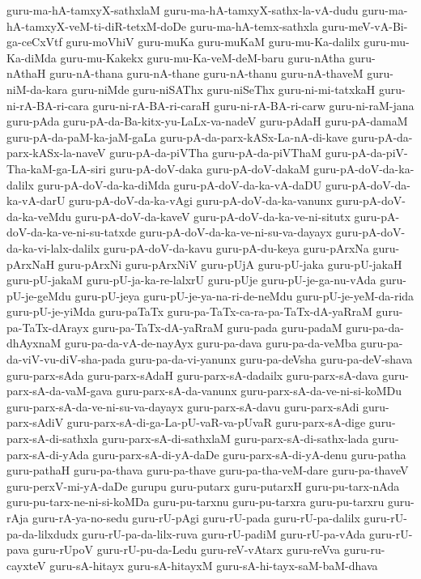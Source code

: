 {guru-ma-hA-tamxyX-sathxlaM
guru-ma-hA-tamxyX-sathx-la-vA-dudu
guru-ma-hA-tamxyX-veM-ti-diR-tetxM-doDe
guru-ma-hA-temx-sathxla
guru-meV-vA-Bi-ga-ceCxVtf
guru-moVhiV
guru-muKa
guru-muKaM
guru-mu-Ka-dalilx
guru-mu-Ka-diMda
guru-mu-Kakekx
guru-mu-Ka-veM-deM-baru
guru-nAtha
guru-nAthaH
guru-nA-thana
guru-nA-thane
guru-nA-thanu
guru-nA-thaveM
guru-niM-da-kara
guru-niMde
guru-niSAThx
guru-niSeThx
guru-ni-mi-tatxkaH
guru-ni-rA-BA-ri-cara
guru-ni-rA-BA-ri-caraH
guru-ni-rA-BA-ri-carw
guru-ni-raM-jana
guru-pAda
guru-pA-da-Ba-kitx-yu-LaLx-va-nadeV
guru-pAdaH
guru-pA-damaM
guru-pA-da-paM-ka-jaM-gaLa
guru-pA-da-parx-kASx-La-nA-di-kave
guru-pA-da-parx-kASx-la-naveV
guru-pA-da-piVTha
guru-pA-da-piVThaM
guru-pA-da-piV-Tha-kaM-ga-LA-siri
guru-pA-doV-daka
guru-pA-doV-dakaM
guru-pA-doV-da-ka-dalilx
guru-pA-doV-da-ka-diMda
guru-pA-doV-da-ka-vA-daDU
guru-pA-doV-da-ka-vA-darU
guru-pA-doV-da-ka-vAgi
guru-pA-doV-da-ka-vanunx
guru-pA-doV-da-ka-veMdu
guru-pA-doV-da-kaveV
guru-pA-doV-da-ka-ve-ni-situtx
guru-pA-doV-da-ka-ve-ni-su-tatxde
guru-pA-doV-da-ka-ve-ni-su-va-dayayx
guru-pA-doV-da-ka-vi-lalx-dalilx
guru-pA-doV-da-kavu
guru-pA-du-keya
guru-pArxNa
guru-pArxNaH
guru-pArxNi
guru-pArxNiV
guru-pUjA
guru-pU-jaka
guru-pU-jakaH
guru-pU-jakaM
guru-pU-ja-ka-re-lalxrU
guru-pUje
guru-pU-je-ga-nu-vAda
guru-pU-je-geMdu
guru-pU-jeya
guru-pU-je-ya-na-ri-de-neMdu
guru-pU-je-yeM-da-rida
guru-pU-je-yiMda
guru-paTaTx
guru-pa-TaTx-ca-ra-pa-TaTx-dA-yaRraM
guru-pa-TaTx-dArayx
guru-pa-TaTx-dA-yaRraM
guru-pada
guru-padaM
guru-pa-da-dhAyxnaM
guru-pa-da-vA-de-nayAyx
guru-pa-dava
guru-pa-da-veMba
guru-pa-da-viV-vu-diV-sha-pada
guru-pa-da-vi-yanunx
guru-pa-deVsha
guru-pa-deV-shava
guru-parx-sAda
guru-parx-sAdaH
guru-parx-sA-dadailx
guru-parx-sA-dava
guru-parx-sA-da-vaM-gava
guru-parx-sA-da-vanunx
guru-parx-sA-da-ve-ni-si-koMDu
guru-parx-sA-da-ve-ni-su-va-dayayx
guru-parx-sA-davu
guru-parx-sAdi
guru-parx-sAdiV
guru-parx-sA-di-ga-La-pU-vaR-va-pUvaR
guru-parx-sA-dige
guru-parx-sA-di-sathxla
guru-parx-sA-di-sathxlaM
guru-parx-sA-di-sathx-lada
guru-parx-sA-di-yAda
guru-parx-sA-di-yA-daDe
guru-parx-sA-di-yA-denu
guru-patha
guru-pathaH
guru-pa-thava
guru-pa-thave
guru-pa-tha-veM-dare
guru-pa-thaveV
guru-perxV-mi-yA-daDe
gurupu
guru-putarx
guru-putarxH
guru-pu-tarx-nAda
guru-pu-tarx-ne-ni-si-koMDa
guru-pu-tarxnu
guru-pu-tarxra
guru-pu-tarxru
guru-rAja
guru-rA-ya-no-sedu
guru-rU-pAgi
guru-rU-pada
guru-rU-pa-dalilx
guru-rU-pa-da-lilxdudx
guru-rU-pa-da-lilx-ruva
guru-rU-padiM
guru-rU-pa-vAda
guru-rU-pava
guru-rUpoV
guru-rU-pu-da-Ledu
guru-reV-vAtarx
guru-reVva
guru-ru-cayxteV
guru-sA-hitayx
guru-sA-hitayxM
guru-sA-hi-tayx-saM-baM-dhava
}
